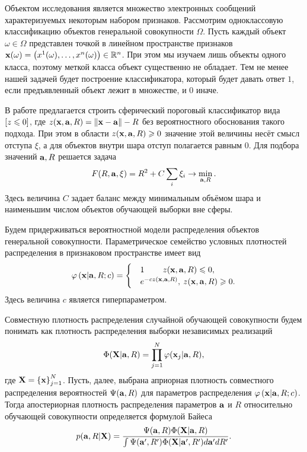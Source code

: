 Объектом исследования является множество электронных сообщений характеризуемых некоторым набором признаков.
Рассмотрим одноклассовую классификацию объектов генеральной совокупности $\Omega$.
Пусть каждый объект $\omega \in{\Omega}$  представлен точкой в линейном пространстве признаков
$\mathbf{x}(\omega)=\left(x^1(\omega),\ldots, x^n(\omega)\right) \in {\mathbb R^n}$. При этом мы изучаем лишь объекты одного класса, поэтому меткой класса объект существенно не обладает. 
Тем не менее нашей задачей будет построение классификатора, который будет давать ответ $1$, если предъявленный объект лежит в множестве, и $0$ иначе.

В работе \cite{} предлагается строить сферический пороговый классификатор вида 
$\left[z \leqslant 0\right] $, где $z(\mathbf{x},\mathbf{a},R)=\left\|{\mathbf{x}-\mathbf{a}}\right\|-R$ без вероятностного обоснования такого подхода. При этом в области $z(\mathbf{x}, \mathbf{a}, R) \geqslant 0$ значение этой величины несёт смысл отступа $\xi$, а для объектов внутри шара отступ полагается равным 0. Для подбора значений $\mathbf{a}, R$ решается задача
\begin{equation}
	\label{min:noprob}
	F(R,\mathbf{a}, \mathbf{\xi}) = R^2 + C\sum_i\xi_i \to \min_{\mathbf{a}, R}.
\end{equation}
Здесь величина $C$ задает баланс между минимальным объёмом шара и наименьшим числом объектов обучающей выборки вне сферы.


Будем придерживаться вероятностной модели распределения объектов генеральной совокупности.
Параметрическое семейство условных плотностей распределения в признаковом пространстве имеет вид 
\begin{equation}
	\label{PhiXARC}
	\varphi \left( {\mathbf{x} | \mathbf{a},R;c} \right) =
		\begin{cases}
			&1 				\qquad  	\: 	z(\mathbf{x},\mathbf{a},R) \leqslant 0, \\
			&e^{-c z(\mathbf{x},\mathbf{a},R)}, 	\:	z(\mathbf{x},\mathbf{a},R) \geqslant 0.
		\end{cases} 
\end{equation}
Здесь величина $c$ является гиперпараметром.


Совместную плотность распределения случайной обучающей совокупности будем понимать как плотность распределения выборки независимых реализаций
$$\Phi(\mathbf{X}|\mathbf{a},R)=\prod_{j=1}^N \varphi(\mathbf{x}_j|\mathbf{a},R),$$ 
где $\mathbf{X}=\left\{\mathbf{x}\right\}_{j=1}^N$.
Пусть, далее, выбрана априорная плотность совместного распределения вероятностей $\Psi(\mathbf{a},R)$ для параметров распределения $\varphi \left(\mathbf{x} | \mathbf{a},R;c\right)$. 
Тогда апостериорная плотность распределения параметров $\mathbf{a}$ и $R$ относительно обучающей совокупности определяется формулой Байеса
\begin{equation}
	\label{Prob:aRX}
	p(\mathbf{a},R|\mathbf{X})
	= \frac {\Psi(\mathbf{a},R) \Phi(\mathbf{X}|\mathbf{a},R)}
			{\int {\Psi(\ensuremath{\mathbf{a}}',R') \Phi(\ensuremath{\mathbf{X}}|\ensuremath{\mathbf{a}}',R')d\ensuremath{\mathbf{a}}'dR'}}.
\end{equation}

